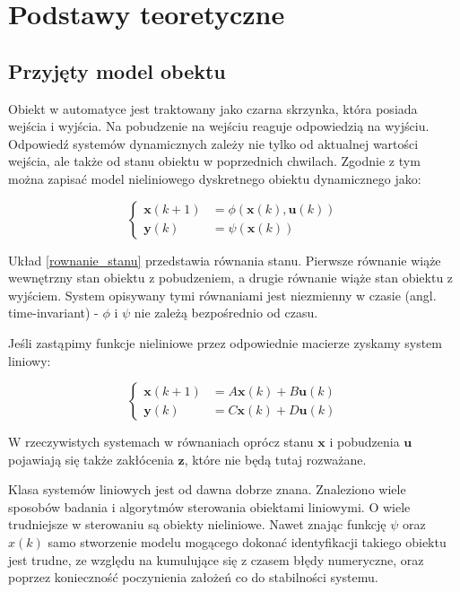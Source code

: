\documentclass{article}
\newcommand{\bb}{\textbf}
\begin{document}
\section{Podstawy teoretyczne}

\subsection{Przyjęty model obektu}

Obiekt w automatyce jest traktowany jako czarna skrzynka, która posiada wejścia i wyjścia. Na pobudzenie na wejściu reaguje odpowiedzią na wyjściu. Odpowiedź systemów dynamicznych zależy nie tylko od aktualnej wartości wejścia, ale także od stanu obiektu w poprzednich chwilach. Zgodnie z tym można zapisać model nieliniowego dyskretnego obiektu dynamicznego jako:

\begin{equation}
\left\{
\begin{array}{ll}
	\bb{x}(k+1) &= \phi (\bb{x}(k), \bb{u}(k)) \\
	\bb{y}(k)   &= \psi (\bb{x}(k))
\end{array} \right.
\label{rownanie_stanu}
\end{equation}

Układ \ref{rownanie_stanu} przedstawia równania stanu. Pierwsze równanie wiąże wewnętrzny stan obiektu z pobudzeniem, a drugie równanie wiąże stan obiektu z wyjściem. System opisywany tymi równaniami jest niezmienny w czasie (angl. time-invariant) - $\phi$ i $\psi$ nie zależą bezpośrednio od czasu.

Jeśli zastąpimy funkcje nieliniowe przez odpowiednie macierze zyskamy system liniowy:

\begin{equation}
\left\{
\begin{array}{ll}
	\bb{x}(k+1) &= A\bb{x}(k) + B\bb{u}(k) \\
	\bb{y}(k)   &= C\bb{x}(k) + D\bb{u}(k)
\end{array} \right.
\end{equation}

W rzeczywistych systemach w równaniach oprócz stanu $\bb{x}$ i pobudzenia $\bb{u}$ pojawiają się także zakłócenia $\bb{z}$, które nie będą tutaj rozważane.

Klasa systemów liniowych jest od dawna dobrze znana. Znaleziono wiele sposobów badania i algorytmów sterowania obiektami liniowymi. O wiele trudniejsze w sterowaniu są obiekty nieliniowe. Nawet znając funkcję $\psi$ oraz $x(k)$ samo stworzenie modelu mogącego dokonać identyfikacji takiego obiektu jest trudne, ze względu na kumulujące się z czasem błędy numeryczne, oraz poprzez konieczność poczynienia założeń co do stabilności systemu.
\end{document}
